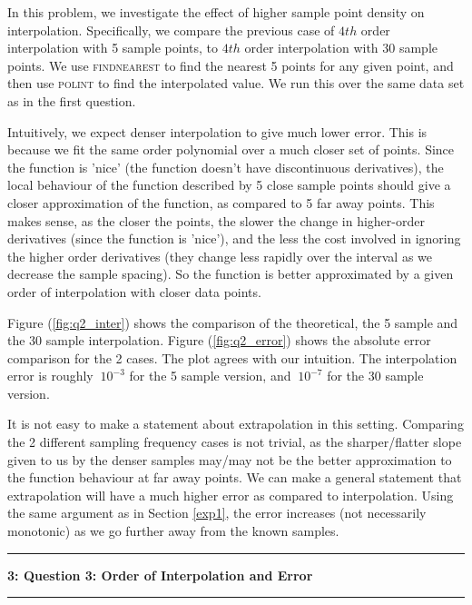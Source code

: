 \documentclass[11pt]{article}
\newcommand\question[2]{\vspace{.25in}\hrule\textbf{#1: #2}\vspace{.5em}\hrule\vspace{.10in}}
\begin{document}
In this problem, we investigate the effect of higher sample point density on interpolation. Specifically, we compare the previous case of $4th$ order interpolation with 5 sample points, to $4th$ order interpolation with 30 sample points. We use \textsc{findnearest} to find the nearest 5 points for any given point, and then use \textsc{polint} to find the interpolated value. We run this over the same data set as in the first question. 

Intuitively, we expect denser interpolation to give much lower error. This is because we fit the same order polynomial over a much closer set of points. Since the function is 'nice' (the function doesn't have discontinuous derivatives), the local behaviour of the function described by 5 close sample points should give a closer approximation of the function, as compared to 5 far away points. This makes sense, as the closer the points, the slower the change in higher-order derivatives (since the function is 'nice'), and the less the cost involved in ignoring the higher order derivatives (they change less rapidly over the interval as we decrease the sample spacing). So the function is better approximated by a given order of interpolation with closer data points.

Figure (\ref{fig:q2_inter}) shows the comparison of the theoretical, the 5 sample and the 30 sample interpolation. Figure (\ref{fig:q2_error}) shows the absolute error comparison for the 2 cases. The plot agrees with our intuition. The interpolation error is roughly $~10^{-3}$ for the 5 sample version, and $~10^{-7}$ for the 30 sample version.

It is not easy to make a statement about extrapolation in this setting. Comparing the 2 different sampling frequency cases is not trivial, as the sharper/flatter slope given to us by the denser samples may/may not be the better approximation to the function behaviour at far away points. We can make a general statement that extrapolation will have a much higher error as compared to interpolation. Using the same argument as in Section \ref{exp1}, the error increases (not necessarily monotonic) as we go further away from the known samples. 

\question{3}{Question 3: Order of Interpolation and Error} 
\setcounter{section}{3}
\end{document}
